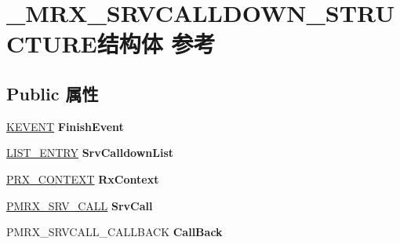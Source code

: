 \hypertarget{struct___m_r_x___s_r_v_c_a_l_l_d_o_w_n___s_t_r_u_c_t_u_r_e}{}\section{\+\_\+\+M\+R\+X\+\_\+\+S\+R\+V\+C\+A\+L\+L\+D\+O\+W\+N\+\_\+\+S\+T\+R\+U\+C\+T\+U\+R\+E结构体 参考}
\label{struct___m_r_x___s_r_v_c_a_l_l_d_o_w_n___s_t_r_u_c_t_u_r_e}
\subsection*{Public 属性}
\begin{DoxyCompactItemize}
\item 
\mbox{\label{struct___m_r_x___s_r_v_c_a_l_l_d_o_w_n___s_t_r_u_c_t_u_r_e_afe266114f4fe97590dce19addec40cb2}} 
\hyperlink{struct___k_e_v_e_n_t}{K\+E\+V\+E\+NT} {\bfseries Finish\+Event}
\item 
\mbox{\label{struct___m_r_x___s_r_v_c_a_l_l_d_o_w_n___s_t_r_u_c_t_u_r_e_af1898188be38a3a1b81ef448b4403f9b}} 
\hyperlink{struct___l_i_s_t___e_n_t_r_y}{L\+I\+S\+T\+\_\+\+E\+N\+T\+RY} {\bfseries Srv\+Calldown\+List}
\item 
\mbox{\label{struct___m_r_x___s_r_v_c_a_l_l_d_o_w_n___s_t_r_u_c_t_u_r_e_a392e685f4354d3df0ce79981b3aa9681}} 
\hyperlink{struct___r_x___c_o_n_t_e_x_t}{P\+R\+X\+\_\+\+C\+O\+N\+T\+E\+XT} {\bfseries Rx\+Context}
\item 
\mbox{\label{struct___m_r_x___s_r_v_c_a_l_l_d_o_w_n___s_t_r_u_c_t_u_r_e_a2f9ce3c40e09646f29ea2dac155e35b6}} 
\hyperlink{struct___m_r_x___s_r_v___c_a_l_l__}{P\+M\+R\+X\+\_\+\+S\+R\+V\+\_\+\+C\+A\+LL} {\bfseries Srv\+Call}
\item 
\mbox{\label{struct___m_r_x___s_r_v_c_a_l_l_d_o_w_n___s_t_r_u_c_t_u_r_e_a407c1d29a35114c75e618dc24ba89aa1}} 
P\+M\+R\+X\+\_\+\+S\+R\+V\+C\+A\+L\+L\+\_\+\+C\+A\+L\+L\+B\+A\+CK {\bfseries Call\+Back}

\end{DoxyCompactItemize}
